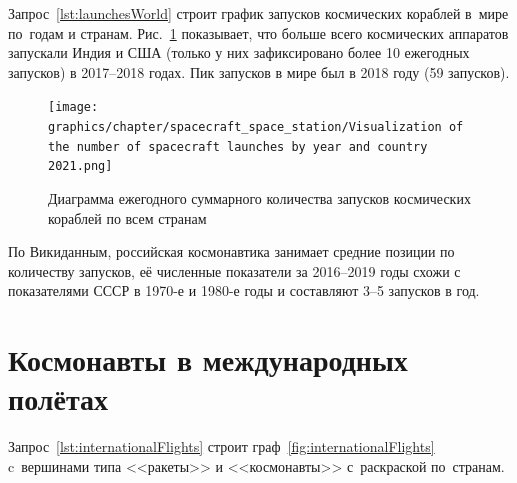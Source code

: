 Запрос~\ref{lst:launchesWorld} строит график 
запусков космических кораблей в~мире по~годам и странам. 
Рис.~\ref{fig:launchesWorld} показывает, что больше всего космических аппаратов 
запускали Индия и США 
(только у них зафиксировано более 10 ежегодных запусков) в 2017--2018 годах. 
Пик запусков в мире был в 2018 году (59 запусков). 




\newpage

\begin{figure}[h!]
  \texttt{[image: graphics/chapter/spacecraft\_space\_station/Visualization of the number of spacecraft launches by year and country 2021.png]}
  \caption[График запусков космических кораблей в мире по годам и странам, 2021 год.]{Диаграмма ежегодного суммарного количества запусков космических кораблей по всем странам}
  \label{fig:launchesWorld}%
\end{figure}


\newpage

По Викиданным, российская космонавтика занимает средние позиции по количеству запусков, 
её численные показатели за 2016--2019 годы схожи с показателями СССР в 1970-е и 1980-е годы 
и составляют 3--5 запусков в год.



\section{Космонавты в международных полётах}

Запрос~\ref{lst:internationalFlights} строит граф~\ref{fig:internationalFlights} 
c~вершинами типа <<ракеты>> и <<космонавты>> с~раскраской по~странам.


